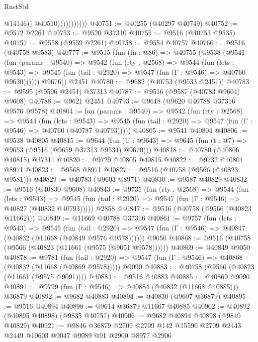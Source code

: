 \begin{lexlean}{RustStd}
\begin{coremodule}
                              @14146))
                          @40510)))))))))))
@40751 := @40255 (@40297 @40749)
@40752 := @9512 @2261
@40753 := @9520 @37310
@40755 := @9516 (@40753 @9535)
@40757 := @9558 (@9559 @2261)
@40758 := @9554 @40757
@40760 := @9516 (@40758 @9583)
@40777 := @9515
    (fun (fn : @86) =>
    @40755
      (@9538
        (@9541
          (fun (params : @9540) =>
          @9542
            (fun (rty : @2568) =>
            @9544
              (fun (lets : @9543) =>
              @9545 (fun (tail : @2920) => @9547 (fun (Γ : @9546) => @40760 @9630))))))
        @9676))
    @2451
@40780 := @9682 (@40753 (@9533 @2451))
@40783 := @9595 (@9596 @2451) @37313
@40787 := @9516 (@9587 (@40783 @9604) @9608)
@40788 := @9621 @2451
@40793 := @9618 (@9620 @40788 @37316 @9576 @9578)
@40804 := fun (params : @9540) =>
  @9542
    (fun (rty : @2568) =>
    @9544
      (fun (lets : @9543) =>
      @9545 (fun (tail : @2920) => @9547 (fun (Γ : @9546) => @40760 (@40787 @40793)))))
@40805 := @9541 @40804
@40806 := @9538 @40805
@40815 := @9644
    (fun (U : @9643) => @9645 (fun (t : @7) => @9653 (@9516 (@9659 @37313 @9534) @9670)))
@40818 := @40780 (@40806 @40815) @37311
@40820 := @9729 @40805 @40815
@40822 := @9732 @40804 @8971
@40823 := @9568 @8971
@40827 := @9516 (@40758 (@9566 (@40823 @9581)))
@40829 := @40783 (@9603 @8971)
@40830 := @9587 @40829
@40832 := @9516 (@40830 @9608)
@40843 := @9735
    (fun (rty : @2568) =>
    @9544
      (fun (lets : @9543) =>
      @9545 (fun (tail : @2920) => @9547 (fun (Γ : @9546) => @40827 (@40832 @40793)))))
    @2858
@40847 := @9516 (@40758 (@9566 (@40823 @11662)))
@40849 := @11669 @40788 @37316
@40861 := @9757
    (fun (lets : @9543) =>
    @9545
      (fun (tail : @2920) =>
      @9547 (fun (Γ : @9546) => @40847 (@40832 (@11668 (@40849 @9576 @9578))))))
    @9050
@40868 := @9516 (@40758 (@9566 (@40823 (@11661 (@9575 (@9051 @9578))))))
@40869 := @40849 @9050
@40878 := @9781
    (fun (tail : @2920) => @9547 (fun (Γ : @9546) => @40868 (@40832 (@11668 (@40869 @9578)))))
    @9090
@40883 := @40758 (@9566 (@40823 (@11661 (@9575 @9091))))
@40884 := @9516 @40883
@40885 := @40869 @9090
@40891 := @9799 (fun (Γ : @9546) => @40884 (@40832 (@11668 @40885))) @36879
@40892 := @9682 @40883
@40894 := @40830 (@9607 @36879)
@40895 := @9516 @40894
@40898 := @9614 @36879 @11667 @40885
@40902 := @40892 (@40895 @40898) (@9835 @40757)
@40906 := @9682 @40894 @40898 (@9840 @40829)
@40921 := @9846
    @36879
    @2709
    @2709
    @142
    @15590
    @2709
    @2443
    @2449
    @10603
    @9047
    @9089
    @91
    @2900
    @8977
    @2906

\end{coremodule}
\end{lexlean}
